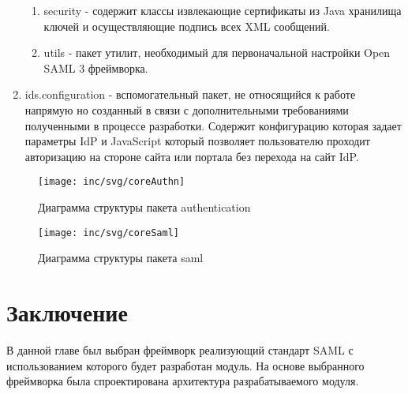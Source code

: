 \begin{enumerate}
\begin{enumerate}
\item security - содержит классы извлекающие сертификаты из Java хранилища ключей и осуществляющие подпись всех XML сообщений.
\item utils - пакет утилит, необходимый для первоначальной настройки Open SAML 3 фреймворка.
\end{enumerate}
\item ids.configuration - вспомогательный пакет, не относящийся к работе напрямую но созданный в связи с дополнительными требованиями полученными в процессе разработки. Содержит конфигурацию которая задает параметры IdP и JavaScript который позволяет пользователю проходит авторизацию на стороне сайта или портала без перехода на сайт IdP.
\end{enumerate}		

\begin{figure}[h]
  \centering
  \texttt{[image: inc/svg/coreAuthn]}
  \caption{Диаграмма структуры пакета authentication}
  \label{fig:coreAuthn}
\end{figure}

\begin{figure}[H]
  \centering
  \texttt{[image: inc/svg/coreSaml]}
  \caption{Диаграмма структуры пакета saml}
  \label{fig:coreSaml}
\end{figure}

\section{Заключение}
В данной главе был выбран фреймворк реализующий стандарт SAML с использованием которого будет разработан модуль. На основе выбранного фреймворка была спроектирована архитектура разрабатываемого модуля.

